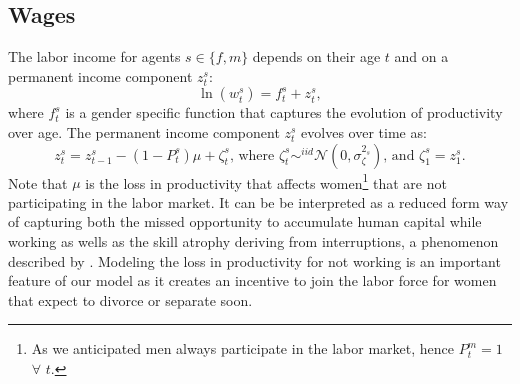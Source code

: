 \documentclass[12pt]{article}
\numberwithin{table}{section}
\begin{document}
\subsection{Wages}
The labor income for agents $s\in\{f,m\}$ depends on their age $t$ and on a permanent income component $z^s_t$:
\[\ln(w^s_t)=f^s_t+z^s_t,\]
where $f^s_t$ is a gender specific function that captures the evolution of productivity over age. The permanent income component  $z^s_t$ evolves over time as:
\begin{equation}\label{eq:pcomp}
z^s_t=z^s_{t-1}-(1-P_t^s) \mu+\zeta^s_{t}\text{, where }\zeta^s_{t}\sim^{iid}\mathcal{N}(0,\sigma_\zeta^{2_s})\text{, and }\zeta^s_{1}=z^s_{1}.
\end{equation}
Note that $\mu$ is the loss in productivity that affects women\footnote{As we anticipated men always participate in the labor market, hence $P^m_t=1$ $\forall$ $t$.} that are not participating in the labor market. It can be be interpreted as a reduced form way of capturing both the missed opportunity to accumulate human capital while working as wells as the skill atrophy deriving from interruptions, a phenomenon described by \cite{adda2017}. Modeling the loss in productivity for not working is an important feature of our model as it creates an incentive to join the labor force for women that expect to divorce or separate soon. 
\end{document}
